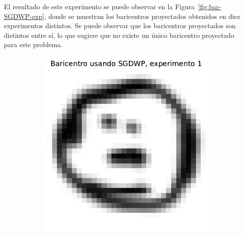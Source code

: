 El resultado de este experimento se puede observar en la Figura~\ref{fig:bar-SGDWP-exp}, donde se muestran los baricentros proyectados obtenidos en diez experimentos distintos. Se puede observar que los baricentros proyectados son distintos entre sí, lo que sugiere que no existe un único baricentro proyectado para este problema.
\begin{figure}[H]
    \centering
    \begin{subfigure}[b]{0.17\textwidth}
        \centering
        \includegraphics[width=\textwidth]{img/sgdwp/bar-SGDWP-exp-01.pdf}
        \label{fig:bar-SGDWP-exp-01}
    \end{subfigure}
    \hfill
    \begin{subfigure}[b]{0.17\textwidth}
        \centering

\end{subfigure}
\end{figure}
